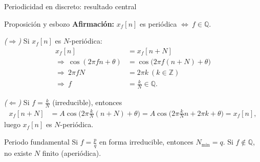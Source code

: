\documentclass[
    10pt,
    aspectratio=169,
    xcolor={dvipsnames},
    spanish,
    ]{beamer}
\begin{document}
\begin{frame}{Periodicidad en discreto: resultado central}
\begin{block}{Proposición y esbozo}
  \footnotesize
\textbf{Afirmación:} \(x_f[n]\) es periódica \(\Leftrightarrow\ f\in\mathbb{Q}\).

\textit{(\(\Rightarrow\))} Si \(x_f[n]\) es \(N\)-periódica:
\[
\begin{aligned}
x_f[n]&=x_f[n+N] \\
\Rightarrow\ \cos(2\pi f n+\theta)&=\cos\!\big(2\pi f(n+N)+\theta\big) \\
\Rightarrow\ 2\pi fN&=2\pi k\ (k\in\mathbb{Z}) \\
\Rightarrow\ f&=\tfrac{k}{N}\in\mathbb{Q}.
\end{aligned}
\]

\textit{(\(\Leftarrow\))} Si \(f=\tfrac{k}{N}\) (irreducible), entonces
\[
\begin{aligned}
x_f[n+N]
&=A\cos\!\Big(2\pi\tfrac{k}{N}(n+N)+\theta\Big)
= A\cos\!\Big(2\pi\tfrac{k}{N}n+2\pi k+\theta\Big)
= x_f[n],
\end{aligned}
\]
luego \(x_f[n]\) es \(N\)-periódica.
\end{block}

\begin{alertblock}{Periodo fundamental}
Si \(f=\frac{p}{q}\) en forma irreducible, entonces \(N_{\min}=q\).  
Si \(f\notin\mathbb{Q}\), no existe \(N\) finito (aperiódica).
\end{alertblock}
\end{frame}
\end{document}
